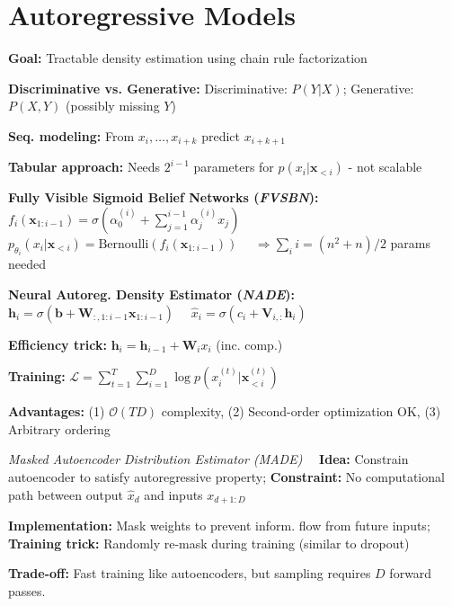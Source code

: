 \section{Autoregressive Models}


\textbf{Goal:} Tractable density estimation using chain rule factorization

\textbf{Discriminative vs. Generative:} Discriminative: $P(Y | X)$; Generative: $P(X, Y)$ (possibly missing $Y$)

\textbf{Seq. modeling:} From $x_i, \ldots, x_{i+k}$ predict $x_{i+k+1}$

\textbf{Tabular approach:} Needs $2^{i-1}$ parameters for $p(x_i | \mathbf{x}_{<i})$ - not scalable

\textbf{Fully Visible Sigmoid Belief Networks (\emph{FVSBN}):}
{ \footnotesize
$f_i(\mathbf{x}_{1:i-1}) = \sigma(\alpha_0^{(i)} + \sum_{j=1}^{i-1} \alpha_j^{(i)} x_j) \quad \quad$ 
$p_{\theta_i}(x_i | \mathbf{x}_{<i}) = \text{Bernoulli}(f_i(\mathbf{x}_{1:i-1}))$ $\quad \Rightarrow \sum_i i = (n^2+n)/2$ params needed}

\textbf{Neural Autoreg. Density Estimator (\emph{NADE}):}
{ 
$\mathbf{h}_i = \sigma(\mathbf{b} + \mathbf{W}_{:,1:i-1} \mathbf{x}_{1:i-1})$
$\quad \hat{x}_i = \sigma(c_i + \mathbf{V}_{i,:} \mathbf{h}_i)$ }

\textbf{Efficiency trick:} $\mathbf{h}_i = \mathbf{h}_{i-1} + \mathbf{W}_i x_i$ (inc. comp.)

\textbf{Training:} $\mathcal{L} = \sum_{t=1}^T \sum_{i=1}^D \log p(x_i^{(t)} | \mathbf{x}_{<i}^{(t)})$

\textbf{Advantages:} (1) $\mathcal{O}(TD)$ complexity, (2) Second-order optimization OK, (3) Arbitrary ordering


\emph{Masked Autoencoder Distribution Estimator (MADE)}
$\quad $\textbf{Idea:} Constrain autoencoder to satisfy autoregressive property; 
\textbf{Constraint:} No computational path between output $\hat{x}_d$ and inputs $x_{d+1:D}$

\textbf{Implementation:} Mask weights to prevent inform. flow from future inputs; 
\textbf{Training trick:} Randomly re-mask during training (similar to dropout)

\textbf{Trade-off:} Fast training like autoencoders, but sampling requires $D$ forward passes.

